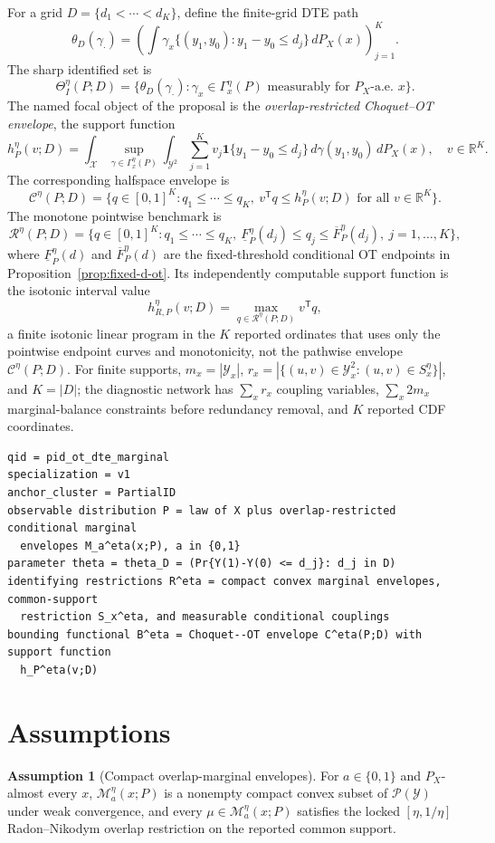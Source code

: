 \documentclass[11pt]{article}
\newcommand{\one}{\mathbf{1}}
\newcommand{\transpose}{\mathsf{T}}
\theoremstyle{definition}
\newtheorem{assumption}{Assumption}
\theoremstyle{plain}
\theoremstyle{remark}
\begin{document}
For a grid \(D=\{d_1<\cdots<d_K\}\), define the finite-grid DTE path
\[
\theta_D(\gamma_\cdot)=
\left(
\int \gamma_x\{(y_1,y_0):y_1-y_0\le d_j\}\,dP_X(x)
\right)_{j=1}^K.
\]
The sharp identified set is
\[
\Theta_I^\eta(P;D)=\{\theta_D(\gamma_\cdot): \gamma_x\in\Gamma^\eta_x(P)
\text{ measurably for }P_X\text{-a.e. }x\}.
\]
The named focal object of the proposal is the \emph{overlap-restricted Choquet--OT
envelope}, the support function
\[
h^\eta_P(v;D)=
\int_{\mathcal X}\sup_{\gamma\in\Gamma^\eta_x(P)}
\int_{\mathcal Y^2}\sum_{j=1}^K v_j\one\{y_1-y_0\le d_j\}\,d\gamma(y_1,y_0)\,dP_X(x),
\quad v\in\mathbb R^K.
\]
The corresponding halfspace envelope is
\[
\mathcal C^\eta(P;D)=
\{q\in[0,1]^K:q_1\le\cdots\le q_K,\ v^\transpose q\le h^\eta_P(v;D)
\text{ for all }v\in\mathbb R^K\}.
\]
The monotone pointwise benchmark is
\[
\mathcal R^\eta(P;D)=
\{q\in[0,1]^K:q_1\le\cdots\le q_K,\
\underline F^\eta_P(d_j)\le q_j\le \overline F^\eta_P(d_j),\ j=1,\ldots,K\},
\]
where \(\underline F^\eta_P(d)\) and \(\overline F^\eta_P(d)\) are the fixed-threshold
conditional OT endpoints in Proposition~\ref{prop:fixed-d-ot}.  Its independently
computable support function is the isotonic interval value
\[
h^\eta_{R,P}(v;D)=\max_{q\in\mathcal R^\eta(P;D)} v^\transpose q,
\]
a finite isotonic linear program in the \(K\) reported ordinates that uses only the
pointwise endpoint curves and monotonicity, not the pathwise envelope
\(\mathcal C^\eta(P;D)\).
For finite supports, \(m_x=|\mathcal Y_x|\), \(r_x=|\{(u,v)\in\mathcal Y_x^2:(u,v)\in
S_x^\eta\}|\), and \(K=|D|\); the diagnostic network has
\(\sum_x r_x\) coupling variables, \(\sum_x 2m_x\) marginal-balance constraints before
redundancy removal, and \(K\) reported CDF coordinates.

\begin{verbatim}
qid = pid_ot_dte_marginal
specialization = v1
anchor_cluster = PartialID
observable distribution P = law of X plus overlap-restricted conditional marginal
  envelopes M_a^eta(x;P), a in {0,1}
parameter theta = theta_D = (Pr{Y(1)-Y(0) <= d_j}: d_j in D)
identifying restrictions R^eta = compact convex marginal envelopes, common-support
  restriction S_x^eta, and measurable conditional couplings
bounding functional B^eta = Choquet--OT envelope C^eta(P;D) with support function
  h_P^eta(v;D)
\end{verbatim}

\section{Assumptions}
\begin{assumption}[Compact overlap-marginal envelopes]\label{ass:compact-envelope}
For \(a\in\{0,1\}\) and \(P_X\)-almost every \(x\), \(\mathcal M_a^\eta(x;P)\) is a
nonempty compact convex subset of \(\mathcal P(\mathcal Y)\) under weak convergence,
and every \(\mu\in\mathcal M_a^\eta(x;P)\) satisfies the locked
\([\eta,1/\eta]\) Radon--Nikodym overlap restriction on the reported common support.
\end{assumption}
\end{document}
